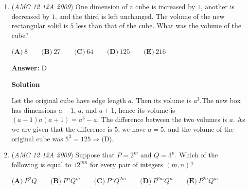 \begin{enumerate}
 \href{https://artofproblemsolving.com/wiki/index.php?title=User:Maxisw}{MisW} (\href{https://artofproblemsolving.com/wiki/index.php?title=User\_talk:Maxisw}{talk})Minor Edits by \href{https://artofproblemsolving.com/wiki/index.php?title=Yanchudeng&action=edit&redlink=1}{yanchudeng}

 Post-Note: This is my first time using LaTeX so it may look a little ugly.

 



\textbf{Solution 2}

This problem is trivial under the fact that there are a total of 256 combinations of pennies (P), nickels (N), dimes (D), and quarters (Q). We can start listing every combination from the lowest, 4 pennies (4P), which is 4 cents. Notice how we can replace pennies with nickels, as 3 pennies and 1 nickel (3P1N) is 8 cents, 2 pennies and 2 nickels (2P2N), is 12 cents, and 3 pennies and 1 dime (3P1D), is 13 cents. Since the next jump is obviously replacing a penny with a nickel, we can see in both scenarios, we end up with 16 cents and 17 cents respectively. In conclusion, A.

 


	\item (\textit{AMC 12 12A 2009}) One dimension of a cube is increased by $1$, another is decreased by $1$, and the third is left unchanged. The volume of the new rectangular solid is $5$ less than that of the cube. What was the volume of the cube?


 $\textbf{(A)}\ 8 \qquad \textbf{(B)}\ 27 \qquad \textbf{(C)}\ 64 \qquad \textbf{(D)}\ 125 \qquad \textbf{(E)}\ 216$

 \textbf{Answer: }D



\textbf{Solution}

Let the original cube have edge length $a$. Then its volume is $a^3$.The new box has dimensions $a-1$, $a$, and $a+1$, hence its volume is $(a-1)a(a+1) = a^3-a$. The difference between the two volumes is $a$. As we are given that the difference is $5$, we have $a=5$, and the volume of the original cube was $5^3 = 125\Rightarrow\boxed{\text{(D)}}$.

 


	\item (\textit{AMC 12 12A 2009}) Suppose that $P = 2^m$ and $Q = 3^n$. Which of the following is equal to $12^{mn}$ for every pair of integers $(m,n)$?


 $\textbf{(A)}\ P^2Q \qquad \textbf{(B)}\ P^nQ^m \qquad \textbf{(C)}\ P^nQ^{2m} \qquad \textbf{(D)}\ P^{2m}Q^n \qquad \textbf{(E)}\ P^{2n}Q^m$


\end{enumerate}
